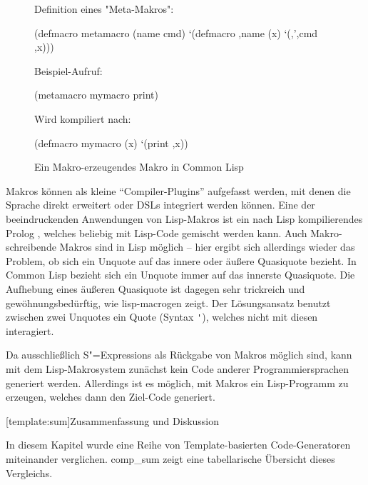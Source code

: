 \documentclass[12pt, a4paper, bibgerm]{scrbook}
\newenvironment{DIFnomarkup}{}{}
\newcommand\icode[1]{\lstinline?#1?}
\newcommand\lsection{}
\newcommand\abb{}
\newcommand{\sexps}{S"=Expressions}
\begin{document}
\begin{figure}[h]
  \centering
  \begin{DIFnomarkup}\begin{code}
Definition eines "Meta-Makros":

(defmacro metamacro (name cmd)
  `(defmacro ,name (x)
     `(,',cmd ,x)))    

Beispiel-Aufruf:

(metamacro mymacro print)

Wird kompiliert nach:

(defmacro mymacro (x)
  `(print ,x))
  \end{code}\end{DIFnomarkup}
  \caption{Ein Makro-erzeugendes Makro in Common Lisp}
  \label{magicl:fig:lisp-macrogen}
\end{figure}

Makros können als kleine "`Compiler-Plugins"' aufgefasst werden, mit
denen die Sprache direkt erweitert oder DSLs integriert werden
können. Eine der beeindruckenden Anwendungen von Lisp-Makros ist ein
nach Lisp kompilierendes Prolog \cite[S.388ff]{NorvigCL}, welches
beliebig mit Lisp-Code gemischt werden kann. Auch Makro-schreibende
Makros sind in Lisp möglich -- hier ergibt sich allerdings wieder das
Problem, ob sich ein Unquote auf das innere oder äußere Quasiquote
bezieht. In Common Lisp bezieht sich ein Unquote immer auf das innerste
Quasiquote. Die Aufhebung eines äußeren Quasiquote ist dagegen sehr
trickreich und gewöhnungsbedürftig, wie \abb{lisp-macrogen} zeigt. Der
Lösungsansatz benutzt zwischen zwei Unquotes ein Quote (Syntax
\icode{'}), welches nicht mit diesen interagiert.

Da ausschließlich \sexps{} als Rückgabe von Makros möglich sind, kann
mit dem Lisp-Makrosystem zunächst kein Code anderer Programmiersprachen
generiert werden. Allerdings ist es möglich, mit Makros ein
Lisp-Programm zu erzeugen, welches dann den Ziel-Code generiert.

\lsection[template:sum]{Zusammenfassung und Diskussion}

In diesem Kapitel wurde eine Reihe von Template-basierten
Code-Generatoren miteinander verglichen. \abb{comp_sum} zeigt eine
tabellarische Übersicht dieses Vergleichs. 
\end{document}
